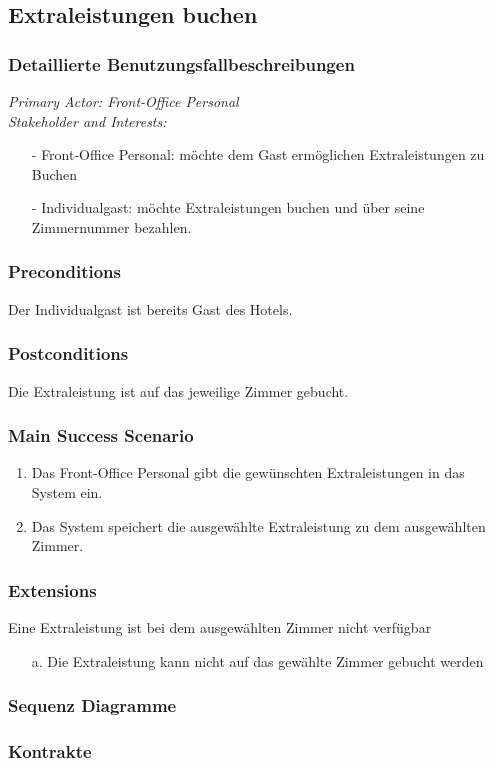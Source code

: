 \documentclass[./detailed_overview_usecases.tex]{subfiles}
\begin{document}
    \subsection{Extraleistungen buchen}
    \subsubsection{Detaillierte Benutzungsfallbeschreibungen}
    \textit{Primary Actor: Front-Office Personal}
    \\
    \textit{Stakeholder and Interests:}
    \begin{itemize}
        \item[-] Front-Office Personal: möchte dem Gast ermöglichen Extraleistungen zu Buchen
        \item[-] Individualgast: möchte Extraleistungen buchen und über seine Zimmernummer bezahlen.
    \end{itemize}

    \subsubsection*{Preconditions}
    Der Individualgast ist bereits Gast des Hotels.

    \subsubsection*{Postconditions}
    Die Extraleistung ist auf das jeweilige Zimmer gebucht.

    \subsubsection*{Main Success Scenario}
    \begin{enumerate}
        \item Das Front-Office Personal gibt die gewünschten Extraleistungen in das System ein.
        \item Das System speichert die ausgewählte Extraleistung zu dem ausgewählten Zimmer.
    \end{enumerate}

    \subsubsection*{Extensions}
    \item Eine Extraleistung ist bei dem ausgewählten Zimmer nicht verfügbar
    \begin{itemize}
        \item[a.] Die Extraleistung kann nicht auf das gewählte Zimmer gebucht werden
    \end{itemize}


    \subsubsection{Sequenz Diagramme}
    \subsubsection{Kontrakte}
\end{document}
